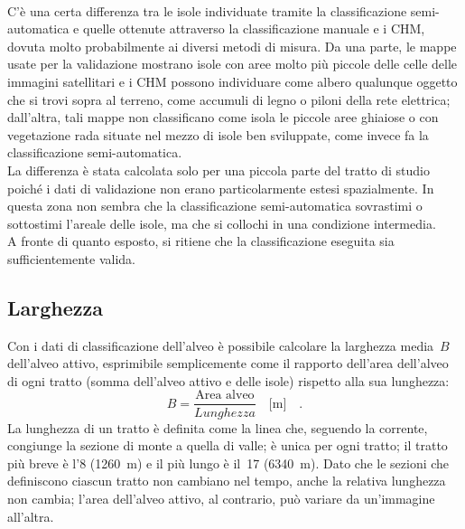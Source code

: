 %
\\
C'è una certa differenza tra le isole individuate tramite la classificazione semi-automatica e quelle ottenute attraverso la classificazione manuale e i CHM, dovuta molto probabilmente ai diversi metodi di misura.
Da una parte, le mappe usate per la validazione mostrano isole con aree molto più piccole delle celle delle immagini satellitari e i CHM possono individuare come albero qualunque oggetto che si trovi sopra al terreno, come accumuli di legno o piloni della rete elettrica; dall'altra, tali mappe non classificano come isola le piccole aree ghiaiose o con vegetazione rada situate nel mezzo di isole ben sviluppate, come invece fa la classificazione semi-automatica.
\\
La differenza è stata calcolata solo per una piccola parte del tratto di studio poiché i dati di validazione non erano particolarmente estesi spazialmente.
In questa zona non sembra che la classificazione semi-automatica sovrastimi o sottostimi l'areale delle isole, ma che si collochi in una condizione intermedia.
\\
A fronte di quanto esposto, si ritiene che la classificazione eseguita sia sufficientemente valida.


\subsection{Larghezza}
Con i dati di classificazione dell'alveo è possibile calcolare la larghezza media~$B$ dell'alveo attivo, esprimibile semplicemente come il rapporto dell'area dell'alveo di ogni tratto (somma dell'alveo attivo e delle isole) rispetto alla sua lunghezza:
%
\begin{equation}
	\label{eq:larghezza-tratto}
	B = \frac{\text{Area alveo}}{Lunghezza} 
	\quad 
	\si{[\m]}
	\quad.
\end{equation}
% 
La lunghezza di un tratto è definita come la linea che,  seguendo la corrente, congiunge la sezione di monte a quella di valle; è unica per ogni tratto; il tratto più breve è l'8 (\SI{1260}{\m}) e il più lungo è il~17 (\SI{6340}{\m}).
Dato che le sezioni che definiscono ciascun tratto non cambiano nel tempo, anche la relativa lunghezza non cambia; l'area dell'alveo attivo, al contrario, può variare da un'immagine all'altra. 
%
%
